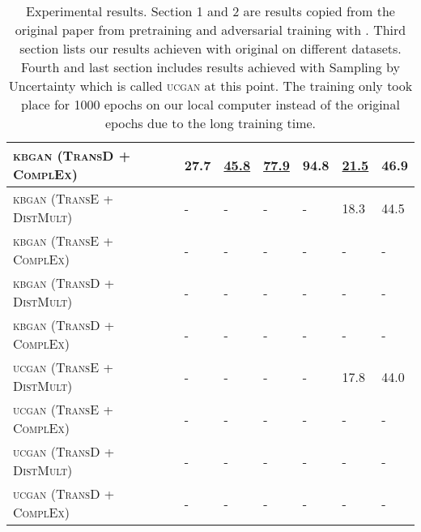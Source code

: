 \begin{table}[h]
\begin{tabular}{lllllll}
        \textsc{kbgan} (\textsc{TransD} + \textsc{ComplEx})   
        & 27.7 & \textbf{\underline{45.8}} & \underline{77.9}
        & 94.8 & \underline{21.5} & 46.9\\
        
         \midrule
          
          \textsc{kbgan} (\textsc{TransE} + \textsc{DistMult})  & -  & - & - & - & 18.3 & 44.5 \\
          
          \textsc{kbgan} (\textsc{TransE} + \textsc{ComplEx})  & -  & - & - & - & - & - \\
          
          \textsc{kbgan} (\textsc{TransD} + \textsc{DistMult})  & -  & - & - & - & - & - \\
          
          \textsc{kbgan} (\textsc{TransD} + \textsc{ComplEx})  & -  & - & - & - & - & - \\
          
          \midrule
         
          \textsc{ucgan} (\textsc{TransE} + \textsc{DistMult}) 
          & -  & - & - & - & 17.8 & 44.0\\
         
         \textsc{ucgan} (\textsc{TransE} + \textsc{ComplEx}) 
          & -  & - & - & - & - & - \\
          
          \textsc{ucgan} (\textsc{TransD} + \textsc{DistMult}) 
          & -  & - & - & - & - & - \\
        
        \textsc{ucgan} (\textsc{TransD} + \textsc{ComplEx}) 
          & -  & - & - & - & - & - \\
          
        \bottomrule
    \end{tabular}
    \caption{Experimental results.
    Section 1 and 2 are results copied from the original paper \cite{cai2017kbgan} from pretraining and adversarial training with \kbgan. 
    Third section lists our results achieven with original \kbgan on different datasets.
    Fourth and last section includes results achieved with Sampling by Uncertainty which is called \textsc{ucgan} at this point.
    The training only took place for 1000 epochs on our local computer instead of the original  epochs due to the long training time.}
\label{tab:results}
\end{table}